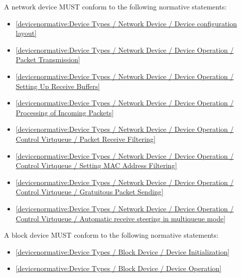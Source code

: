 A network device MUST conform to the following normative statements:

\begin{itemize}
\item \ref{devicenormative:Device Types / Network Device / Device configuration layout}
\item \ref{devicenormative:Device Types / Network Device / Device Operation / Packet Transmission}
\item \ref{devicenormative:Device Types / Network Device / Device Operation / Setting Up Receive Buffers}
\item \ref{devicenormative:Device Types / Network Device / Device Operation / Processing of Incoming Packets}
\item \ref{devicenormative:Device Types / Network Device / Device Operation / Control Virtqueue / Packet Receive Filtering}
\item \ref{devicenormative:Device Types / Network Device / Device Operation / Control Virtqueue / Setting MAC Address Filtering}
\item \ref{devicenormative:Device Types / Network Device / Device Operation / Control Virtqueue / Gratuitous Packet Sending}
\item \ref{devicenormative:Device Types / Network Device / Device Operation / Control Virtqueue / Automatic receive steering in multiqueue mode}
\end{itemize}

\label{sec:Conformance / Device Conformance / Block Device Conformance}

A block device MUST conform to the following normative statements:

\begin{itemize}
\item \ref{devicenormative:Device Types / Block Device / Device Initialization}
\item \ref{devicenormative:Device Types / Block Device / Device Operation}
\end{itemize}

\label{sec:Conformance / Device Conformance / Console Device Conformance}

